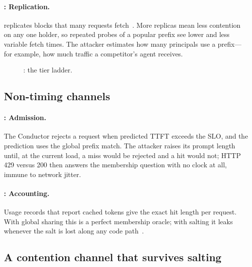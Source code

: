 \paragraph{: Replication.} \mc replicates blocks that many requests
fetch~\cite{qin2025mooncake}. More replicas mean less contention on any one
holder, so repeated probes of a popular prefix see lower and less variable
fetch times. The attacker estimates how many principals use a prefix---for
example, how much traffic a competitor's agent receives. 

\begin{figure}[t]
\centering
{}
\caption{: the tier ladder. }
\label{fig:ladder}
\end{figure}

\subsection{Non-timing channels}

\paragraph{: Admission.} The Conductor rejects a request when predicted
TTFT exceeds the SLO, and the prediction uses the global prefix match. The
attacker raises its prompt length until, at the current load, a miss would be
rejected and a hit would not; HTTP 429 versus 200 then answers the membership
question with no clock at all, immune to network jitter. 

\paragraph{: Accounting.} Usage records that report cached tokens give the
exact hit length per request. With global sharing this is a perfect membership
oracle; with salting it leaks whenever the salt is lost along any code
path~\cite{cve2026105752}. 

\subsection{A contention channel that survives salting}


